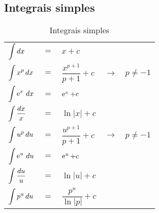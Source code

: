 \subsection{Integrais simples}
	\begin{table}[H]
		\centering
		\begin{tabular}{|lclcr|}
			$\displaystyle\int dx$            & $=$ & $x + c$                       &               &  \\
			$\displaystyle\int x^p\, dx$      & $=$ & $\dfrac{x^{p + 1}}{p+ 1} + c$ & $\rightarrow$ & $p\neq -1$ \\
			$\displaystyle\int \operatorname{e}^x\, dx$     & $=$ & $\operatorname{e}^x + c$                    &               &  \\
			$\displaystyle\int \dfrac{dx}{x}$ & $=$ & $\ln|x| + c$                  &               &  \\
			$\displaystyle\int u^p\, du$      & $=$ & $\dfrac{u^{p + 1}}{p+ 1} + c$ & $\rightarrow$ & $p\neq -1$ \\
			$\displaystyle\int \operatorname{e}^u\, du$     & $=$ & $\operatorname{e}^u + c$                    &               &  \\
			$\displaystyle\int \dfrac{du}{u}$ & $=$ & $\ln|u| + c$                  &               &  \\
			$\displaystyle\int p^u\, du$      & $=$ & $\dfrac{p^u}{\ln|p|} + c$     &               &
		\end{tabular}
		\caption{Integrais simples}
		\label{integrais_simples}
	\end{table}

